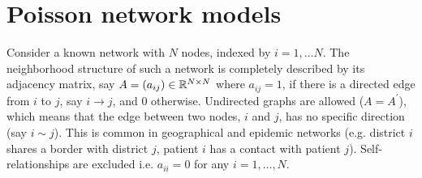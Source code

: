 \section{Poisson network models}
\label{sec:Network autoregressive models}



Consider a known  network with $N$ nodes, indexed by $i=1,\dots N$.  
The neighborhood structure of such a network is completely described by its adjacency matrix, say $A=(a_{ij})\in\mathbb{R}^{N\times N}$ where  $a_{ij}=1$, if there is a directed edge from $i$ to $j$, say $i\to j$, and 0 otherwise. 
Undirected graphs are allowed ($A=A^\prime$), which means that the edge between two nodes, $i$ and $j$, has no specific direction (say $i \sim j$). This is common in geographical and epidemic networks (e.g. district $i$ shares a border with district $j$, patient $i$ has a contact with patient $j$). 
Self-relationships are excluded i.e. $a_{ii}=0$ for any $i=1,\dots,N$. 

